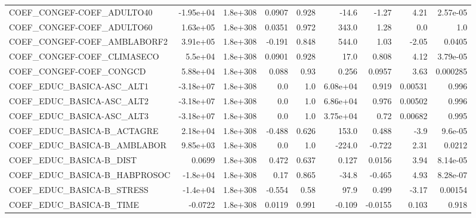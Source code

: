 \begin{tabular}{lrrrrrrrr}
COEF\_CONGEF-COEF\_ADULTO40         &   -1.95e+04 &     1.8e+308 &  0.0907 &    0.928 &      -14.6 &       -1.27 &         4.21 &      2.57e-05 \\
COEF\_CONGEF-COEF\_ADULTO60         &    1.63e+05 &     1.8e+308 &  0.0351 &    0.972 &      343.0 &        1.28 &          0.0 &           1.0 \\
COEF\_CONGEF-COEF\_AMBLABORF2       &    3.91e+05 &     1.8e+308 &  -0.191 &    0.848 &      544.0 &        1.03 &        -2.05 &        0.0405 \\
COEF\_CONGEF-COEF\_CLIMASECO        &     5.5e+04 &     1.8e+308 &  0.0901 &    0.928 &       17.0 &       0.808 &         4.12 &      3.79e-05 \\
COEF\_CONGEF-COEF\_CONGCD           &    5.88e+04 &     1.8e+308 &   0.088 &     0.93 &      0.256 &      0.0957 &         3.63 &      0.000285 \\
COEF\_EDUC\_BASICA-ASC\_ALT1         &   -3.18e+07 &     1.8e+308 &     0.0 &      1.0 &   6.08e+04 &       0.919 &      0.00531 &         0.996 \\
COEF\_EDUC\_BASICA-ASC\_ALT2         &   -3.18e+07 &     1.8e+308 &     0.0 &      1.0 &   6.86e+04 &       0.976 &      0.00502 &         0.996 \\
COEF\_EDUC\_BASICA-ASC\_ALT3         &   -3.18e+07 &     1.8e+308 &     0.0 &      1.0 &   3.75e+04 &        0.72 &      0.00682 &         0.995 \\
COEF\_EDUC\_BASICA-B\_ACTAGRE        &    2.18e+04 &     1.8e+308 &  -0.488 &    0.626 &      153.0 &       0.488 &         -3.9 &       9.6e-05 \\
COEF\_EDUC\_BASICA-B\_AMBLABOR       &    9.85e+03 &     1.8e+308 &     0.0 &      1.0 &     -224.0 &      -0.722 &         2.31 &        0.0212 \\
COEF\_EDUC\_BASICA-B\_DIST           &      0.0699 &     1.8e+308 &   0.472 &    0.637 &      0.127 &      0.0156 &         3.94 &      8.14e-05 \\
COEF\_EDUC\_BASICA-B\_HABPROSOC      &    -1.8e+04 &     1.8e+308 &    0.17 &    0.865 &      -34.8 &      -0.465 &         4.93 &      8.28e-07 \\
COEF\_EDUC\_BASICA-B\_STRESS         &    -1.4e+04 &     1.8e+308 &  -0.554 &     0.58 &       97.9 &       0.499 &        -3.17 &       0.00154 \\
COEF\_EDUC\_BASICA-B\_TIME           &     -0.0722 &     1.8e+308 &  0.0119 &    0.991 &     -0.109 &     -0.0155 &        0.103 &         0.918 \\

\end{tabular}
